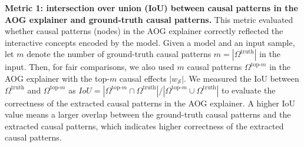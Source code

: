 \documentclass[10pt,twocolumn,letterpaper]{article}
\begin{document}
\begin{table}[t]
\centering
    \vspace{-5pt}
    \caption{IoU ({\small$\uparrow$}) on synthesized datasets. The AOG explainer correctly extracted causal patterns.}
    \label{tab:exp-correctness}
    \vspace{-10pt}
\end{table}


\textbf{Metric 1: intersection over union (IoU) between causal patterns in the AOG explainer and ground-truth causal patterns.}
This metric evaluated whether causal patterns (nodes) in the AOG explainer correctly reflected the interactive concepts encoded by the model.
Given a model and an input sample, let {\small$m$} denote the number of ground-truth causal patterns {\small$m=|\Omega^{\text{truth}}|$} in the input.
Then, for fair comparisons, we also used {\small$m$} causal patterns {\small$\Omega^{\text{top-}m}$} in the AOG explainer with the top-{\small$m$} causal effects {\small$|w_{\mathcal{S}}|$}.
We measured the IoU between {\small$\Omega^{\text{truth}}$} and {\small$\Omega^{\text{top-}m}$} as {\small$\textit{IoU}={|\Omega^{\text{top-}m} \cap \Omega^{\text{truth}}|}/{|\Omega^{\text{top-}m}\cup \Omega^{\text{truth}}|}$} to evaluate the correctness of the extracted causal patterns in the AOG explainer.
A higher IoU value means a larger overlap between the ground-truth causal patterns and the extracted causal patterns, which indicates higher correctness of the extracted causal patterns.
\end{document}
